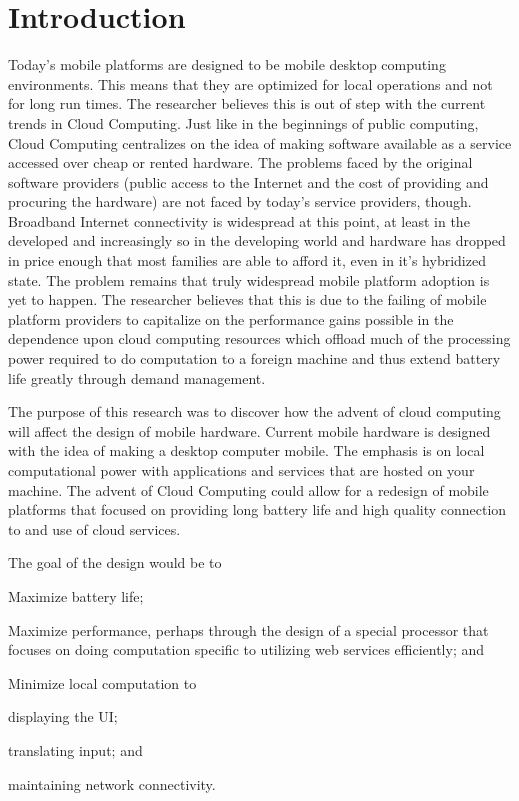 \documentclass[12pt,oneside,letterpaper,titlepage]{report}
\begin{document}
\chapter{Introduction}

\newpage

Today's mobile platforms are designed to be mobile desktop computing
environments.  This means that they are optimized for local operations and not
for long run times.  The researcher believes this is out of step with the
current trends in Cloud Computing.  Just like in the beginnings of public
computing, Cloud Computing centralizes on the idea of making software available
as a service accessed over cheap or rented hardware.  The problems faced by the
original software providers (public access to the Internet and the cost of
providing and procuring the hardware) are not faced by today's service
providers, though.  Broadband Internet connectivity is widespread at this point,
at least in the developed and increasingly so in the developing world and
hardware has dropped in price enough that most families are able to afford it,
even in it's hybridized state.  The problem remains that truly widespread mobile
platform adoption is yet to happen.  The researcher believes that this is due to
the failing of mobile platform providers to capitalize on the performance gains
possible in the dependence upon cloud computing resources which offload much of
the processing power required to do computation to a foreign machine and thus
extend battery life greatly through demand management.

The purpose of this research was to discover how the advent of cloud computing
will affect the design of mobile hardware.  Current mobile hardware is designed
with the idea of making a desktop computer mobile.  The emphasis is on local
computational power with applications and services that are hosted on your
machine.  The advent of Cloud Computing could allow for a redesign of mobile
platforms that focused on providing long battery life and high quality
connection to and use of cloud services.

The goal of the design would be to 
\begin{inparaenum}[(1)]
\item Maximize battery life;
\item Maximize performance, perhaps through the design of a special processor
  that focuses on doing computation specific to utilizing web services
  efficiently; and
\item Minimize local computation to 
  \begin{inparaenum}[(a)]
  \item displaying the UI;
  \item translating input; and
  \item maintaining network connectivity.
  \end{inparaenum}
\end{inparaenum}
\end{document}
